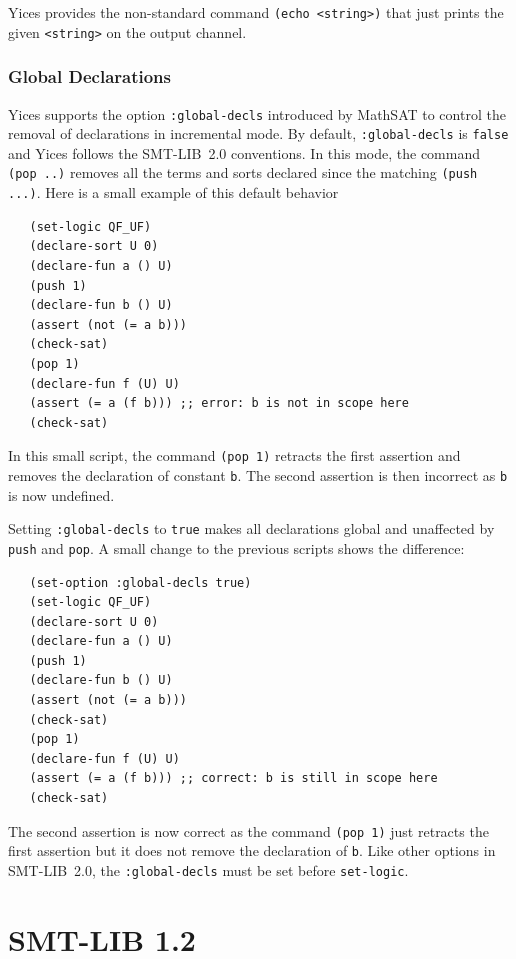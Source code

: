 \documentclass[11pt,twoside,fleqn,openright,titlepage]{cslreport}
\begin{document}
\medskip\noindent Yices provides the non-standard command
\texttt{(echo <string>)} that just prints the given \texttt{<string>}
on the output channel.

\subsubsection*{Global Declarations}

Yices supports the option \texttt{:global-decls} introduced by MathSAT
to control the removal of declarations in incremental mode. By
default, \texttt{:global-decls} is \texttt{false} and Yices follows
the SMT-LIB~2.0 conventions. In this mode, the command \texttt{(pop
  ..)}  removes all the terms and sorts declared since the matching
\texttt{(push ...)}. Here is a small example of this default behavior
\begin{small}
\begin{verbatim}
   (set-logic QF_UF)
   (declare-sort U 0)
   (declare-fun a () U)
   (push 1)
   (declare-fun b () U)
   (assert (not (= a b)))
   (check-sat)
   (pop 1)
   (declare-fun f (U) U)
   (assert (= a (f b))) ;; error: b is not in scope here
   (check-sat)
\end{verbatim}
\end{small}
In this small script, the command \texttt{(pop 1)} retracts the first
assertion and removes the declaration of constant \texttt{b}.  The
second assertion is then incorrect as \texttt{b} is now undefined.

\medskip\noindent Setting \texttt{:global-decls} to \texttt{true}
makes all declarations global and unaffected by \texttt{push} and
\texttt{pop}. A small change to the previous scripts shows the difference:
\begin{small}
\begin{verbatim}
   (set-option :global-decls true)
   (set-logic QF_UF)
   (declare-sort U 0)
   (declare-fun a () U)
   (push 1)
   (declare-fun b () U)
   (assert (not (= a b)))
   (check-sat)
   (pop 1)
   (declare-fun f (U) U)
   (assert (= a (f b))) ;; correct: b is still in scope here
   (check-sat)
\end{verbatim}
\end{small}
The second assertion is now correct as the command \texttt{(pop 1)}
just retracts the first assertion but it does not remove the
declaration of \texttt{b}.  Like other options in SMT-LIB~2.0, the
\texttt{:global-decls} must be set before \texttt{set-logic}.


\section{SMT-LIB 1.2}
\end{document}
